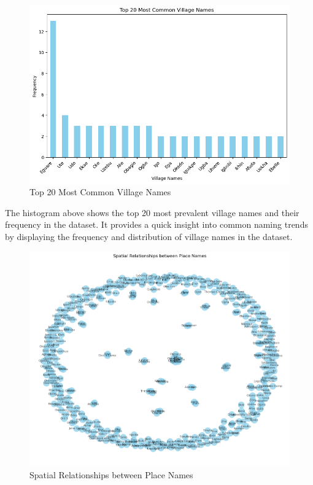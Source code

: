 \begin{figure}[H]
    \centering
    \includegraphics[width=1\linewidth]{histogram2.png}
    \caption{Top 20 Most Common Village Names}
    \label{fig:histogram2}
\end{figure}

The histogram above shows the top 20 most prevalent village names and their frequency in the dataset. It provides a quick insight into common naming trends by displaying the frequency and distribution of village names in the dataset.

\begin{figure}[H]
    \centering
    \includegraphics[width=1\linewidth]{networkanalysis.png}
    \caption{Spatial Relationships between Place Names}
    \label{fig:network}
\end{figure}

